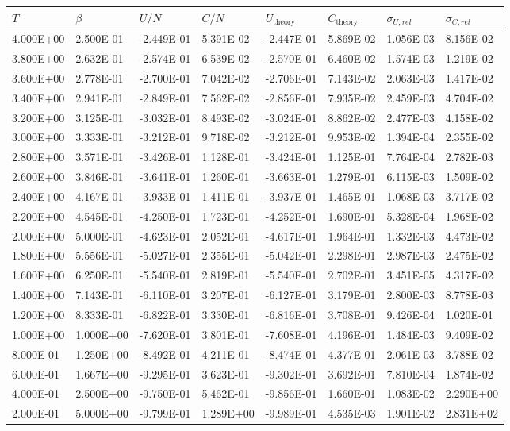 \begin{tabular}{ | l | l | l | l | l | l | l | l | }
    \hline
    $T$       & $\beta$   & $U/N$      & $C/N$     & $U_\text{theory}$ & $C_\text{theory}$ & $\sigma_{U,rel}$ & $\sigma_{C,rel}$ \\
    \hline
    \hline
    4.000E+00 & 2.500E-01 & -2.449E-01 & 5.391E-02 & -2.447E-01 & 5.869E-02 & 1.056E-03 & 8.156E-02 \\ \hline
    3.800E+00 & 2.632E-01 & -2.574E-01 & 6.539E-02 & -2.570E-01 & 6.460E-02 & 1.574E-03 & 1.219E-02 \\ \hline
    3.600E+00 & 2.778E-01 & -2.700E-01 & 7.042E-02 & -2.706E-01 & 7.143E-02 & 2.063E-03 & 1.417E-02 \\ \hline
    3.400E+00 & 2.941E-01 & -2.849E-01 & 7.562E-02 & -2.856E-01 & 7.935E-02 & 2.459E-03 & 4.704E-02 \\ \hline
    3.200E+00 & 3.125E-01 & -3.032E-01 & 8.493E-02 & -3.024E-01 & 8.862E-02 & 2.477E-03 & 4.158E-02 \\ \hline
    3.000E+00 & 3.333E-01 & -3.212E-01 & 9.718E-02 & -3.212E-01 & 9.953E-02 & 1.394E-04 & 2.355E-02 \\ \hline
    2.800E+00 & 3.571E-01 & -3.426E-01 & 1.128E-01 & -3.424E-01 & 1.125E-01 & 7.764E-04 & 2.782E-03 \\ \hline
    2.600E+00 & 3.846E-01 & -3.641E-01 & 1.260E-01 & -3.663E-01 & 1.279E-01 & 6.115E-03 & 1.509E-02 \\ \hline
    2.400E+00 & 4.167E-01 & -3.933E-01 & 1.411E-01 & -3.937E-01 & 1.465E-01 & 1.068E-03 & 3.717E-02 \\ \hline
    2.200E+00 & 4.545E-01 & -4.250E-01 & 1.723E-01 & -4.252E-01 & 1.690E-01 & 5.328E-04 & 1.968E-02 \\ \hline
    2.000E+00 & 5.000E-01 & -4.623E-01 & 2.052E-01 & -4.617E-01 & 1.964E-01 & 1.332E-03 & 4.473E-02 \\ \hline
    1.800E+00 & 5.556E-01 & -5.027E-01 & 2.355E-01 & -5.042E-01 & 2.298E-01 & 2.987E-03 & 2.475E-02 \\ \hline
    1.600E+00 & 6.250E-01 & -5.540E-01 & 2.819E-01 & -5.540E-01 & 2.702E-01 & 3.451E-05 & 4.317E-02 \\ \hline
    1.400E+00 & 7.143E-01 & -6.110E-01 & 3.207E-01 & -6.127E-01 & 3.179E-01 & 2.800E-03 & 8.778E-03 \\ \hline
    1.200E+00 & 8.333E-01 & -6.822E-01 & 3.330E-01 & -6.816E-01 & 3.708E-01 & 9.426E-04 & 1.020E-01 \\ \hline
    1.000E+00 & 1.000E+00 & -7.620E-01 & 3.801E-01 & -7.608E-01 & 4.196E-01 & 1.484E-03 & 9.409E-02 \\ \hline
    8.000E-01 & 1.250E+00 & -8.492E-01 & 4.211E-01 & -8.474E-01 & 4.377E-01 & 2.061E-03 & 3.788E-02 \\ \hline
    6.000E-01 & 1.667E+00 & -9.295E-01 & 3.623E-01 & -9.302E-01 & 3.692E-01 & 7.810E-04 & 1.874E-02 \\ \hline
    4.000E-01 & 2.500E+00 & -9.750E-01 & 5.462E-01 & -9.856E-01 & 1.660E-01 & 1.083E-02 & 2.290E+00 \\ \hline
    2.000E-01 & 5.000E+00 & -9.799E-01 & 1.289E+00 & -9.989E-01 & 4.535E-03 & 1.901E-02 & 2.831E+02 \\
    \hline
\end{tabular}